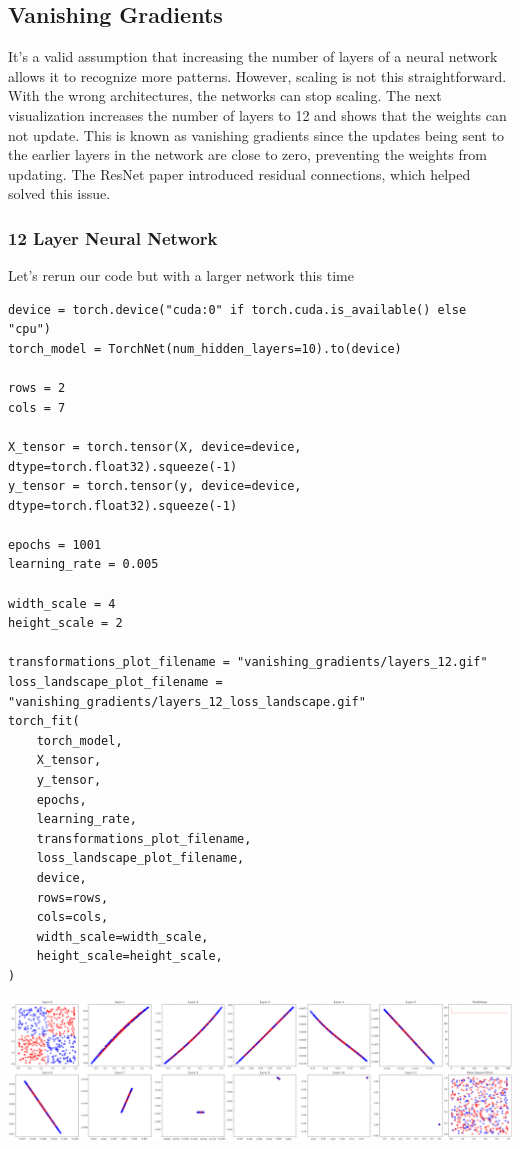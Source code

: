 \documentclass[openany]{book}
\begin{document}
    \subsection{Vanishing Gradients}\label{vanishing-gradients}

It's a valid assumption that increasing the number of layers of a neural
network allows it to recognize more patterns. However, scaling is not
this straightforward. With the wrong architectures, the networks can
stop scaling. The next visualization increases the number of layers to
12 and shows that the weights can not update. This is known as vanishing
gradients since the updates being sent to the earlier layers in the
network are close to zero, preventing the weights from updating. The
ResNet paper introduced residual connections, which helped solved this
issue.

    \subsubsection{12 Layer Neural Network}\label{layer-neural-network}

Let's rerun our code but with a larger network this time

\begin{tcolorbox}
\tiny
\begin{verbatim}
device = torch.device("cuda:0" if torch.cuda.is_available() else "cpu")
torch_model = TorchNet(num_hidden_layers=10).to(device)

rows = 2
cols = 7

X_tensor = torch.tensor(X, device=device, dtype=torch.float32).squeeze(-1)
y_tensor = torch.tensor(y, device=device, dtype=torch.float32).squeeze(-1)

epochs = 1001
learning_rate = 0.005

width_scale = 4
height_scale = 2

transformations_plot_filename = "vanishing_gradients/layers_12.gif"
loss_landscape_plot_filename = "vanishing_gradients/layers_12_loss_landscape.gif"
torch_fit(
    torch_model,
    X_tensor,
    y_tensor,
    epochs,
    learning_rate,
    transformations_plot_filename,
    loss_landscape_plot_filename,
    device,
    rows=rows,
    cols=cols,
    width_scale=width_scale,
    height_scale=height_scale,
)
\end{verbatim}
\end{tcolorbox}

    \begin{center}
    \includegraphics[width=\textwidth]{combined_files/combined_143_1.png}
    \end{center}
    { \hspace*{\fill} \\}
    
\end{document}
